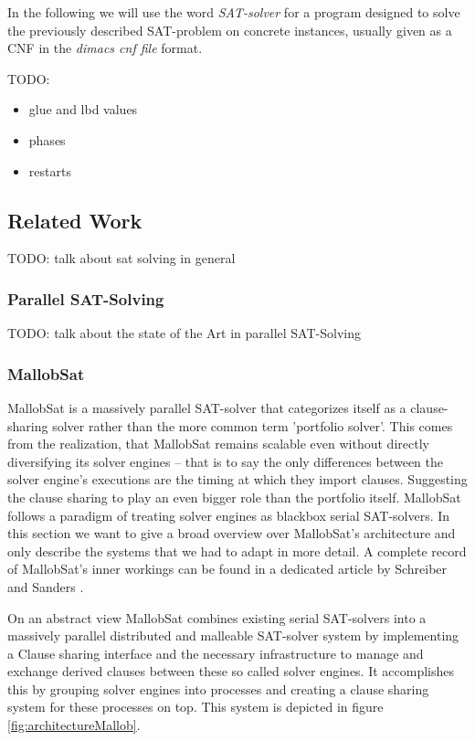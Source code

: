 \documentclass[12pt,a4paper,twoside]{scrartcl}
\numberwithin{equation}{section}
\begin{document}
In the following we will use the word \textit{SAT-solver} for a program designed to solve the previously described SAT-problem on concrete instances, usually given as a CNF in the \textit{dimacs cnf file} format.

TODO:
\begin{itemize}
  \item glue and lbd values
  \item phases
  \item restarts
\end{itemize}

\subsection{Related Work}
\label{sec:relatedWork}

TODO: talk about sat solving in general

\subsubsection{Parallel SAT-Solving}

TODO: talk about the state of the Art in parallel SAT-Solving

\subsubsection{MallobSat}

MallobSat \cite{mallobSat} is a massively parallel SAT-solver that categorizes itself as a clause-sharing solver rather than the more common term 'portfolio solver'. This comes from the realization, that MallobSat remains scalable even without directly diversifying its solver engines -- that is to say the only differences between the solver engine's executions are the timing at which they import clauses. Suggesting the clause sharing to play an even bigger role than the portfolio itself. MallobSat follows a paradigm of treating solver engines as blackbox serial SAT-solvers. In this section we want to give a broad overview over MallobSat's architecture and only describe the systems that we had to adapt in more detail. A complete record of MallobSat's inner workings can be found in a dedicated article by Schreiber and Sanders \cite{mallobSat}.

On an abstract view MallobSat combines existing serial SAT-solvers into a massively parallel distributed and malleable SAT-solver system by implementing a Clause sharing interface and the necessary infrastructure to manage and exchange derived clauses between these so called solver engines. It accomplishes this by grouping solver engines into processes and creating a clause sharing system for these processes on top. This system is depicted in figure \ref{fig:architectureMallob}.
\end{document}
